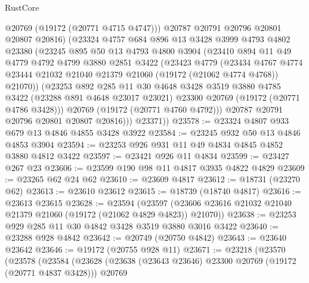 \begin{lexlean}{RustCore}
\begin{coremodule}
              @20769
              (@19172 (@20771 @4715 @4747)))
            @20787
            @20791
            @20796
            @20801
            @20807
            @20816)
          (@23324
            @4757
            @684
            @896
            @13
            @3428
            @3999
            @4793
            @4802
            @23380
            (@23245
              @895
              @50
              @13
              @4793
              @4800
              @3904
              (@23410
                @894
                @11
                @49
                @4779
                @4792
                @4799
                @3880
                @2851
                @3422
                (@23423
                  @4779
                  (@23434
                    @4767
                    @4774
                    @23444
                    @21032
                    @21040
                    @21379
                    @21060
                    (@19172 (@21062 @4774 @4768))
                    @21070))
                (@23253
                  @892
                  @285
                  @11
                  @30
                  @4648
                  @3428
                  @3519
                  @3880
                  @4785
                  @3422
                  (@23288 @891 @4648 @23017 @23021)
                  @23300
                  @20769
                  (@19172 (@20771 @4786 @3428)))
                @20769
                (@19172 (@20771 @4760 @4792)))
              @20787
              @20791
              @20796
              @20801
              @20807
              @20816)))
        @23371))
@23578 := @23324 @4807 @933 @679 @13 @4846 @4855 @3428 @3922
@23584 := @23245 @932 @50 @13 @4846 @4853 @3904
@23594 := @23253 @926 @931 @11 @49 @4834 @4845 @4852 @3880 @4812 @3422
@23597 := @23421 @926 @11 @4834
@23599 := @23427 @267 @23
@23606 := @23599 @190 @98 @11 @4817 @3935 @4822 @4829
@23609 := @23265 @62 @24 @62
@23610 := @23609 @4817
@23612 := @18731 (@23270 @62)
@23613 := @23610 @23612
@23615 := @18739 (@18740 @4817)
@23616 := @23613 @23615
@23628 := @23594
    (@23597 (@23606 @23616 @21032 @21040 @21379 @21060 (@19172 (@21062 @4829 @4823)) @21070))
@23638 := @23253 @929 @285 @11 @30 @4842 @3428 @3519 @3880 @3016 @3422
@23640 := @23288 @928 @4842
@23642 := @20749 (@20750 @4842)
@23643 := @23640 @23642
@23646 := @19172 (@20755 @928 @11)
@23671 := @23218
    (@23570
      (@23578
        (@23584
          (@23628
            (@23638 (@23643 @23646) @23300 @20769 (@19172 (@20771 @4837 @3428)))
            @20769

\end{coremodule}
\end{lexlean}
